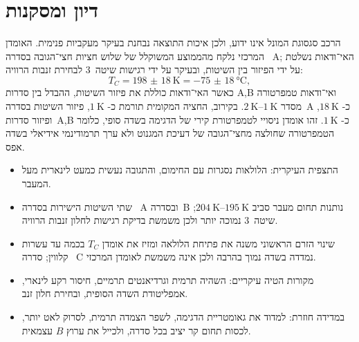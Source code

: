 \documentclass{extarticle}
\begin{document}
\section{דיון ומסקנות}
הרכב סגסוגת המונל אינו ידוע, ולכן איכות התוצאה נבחנת בעיקר מעקביות פנימית. האומדן המרכזי נלקח מהממוצע המשוקלל של שלוש חציות חצי־הגובה בסדרה~
\textenglish{A};
האי־ודאות נשלטת על ידי הפיזור בין השיטות, ובעיקר על ידי רגישות שיטה~3 לבחירת זנבות הרוויה:
\begin{equation}\label{eq:Tc-headline}
T_C=\SI{198(18)}{\kelvin}=\SI{-75(18)}{\degreeCelsius},
\end{equation}
כאשר האי־ודאות כוללת את פיזור השיטות, ההבדל בין סדרות
\textenglish{A,B}
ואי־ודאות טמפרטורה מסדר
$\SI{1}{\kelvin}$--$\SI{2}{\kelvin}$.
בקירוב, החציה המקומית תורמת כ-
$\SI{1}{\kelvin}$,
פיזור השיטות בסדרה~\textenglish{A}
כ-
$\SI{18}{\kelvin}$,
ופיזור סדרות~\textenglish{A,B}
כ-
$\SI{1}{\kelvin}$.
זהו אומדן ניסויי לטמפרטורת קירי של הדגימה בשדה סופי, כלומר הטמפרטורה שחולצה מחצי־הגובה של דעיכת המגנוט ולא ערך תרמודינמי אידיאלי בשדה אפס.

\begin{itemize}
\item התצפית העיקרית: הלולאות נסגרות עם החימום, והתגובה נעשית כמעט לינארית מעל המעבר.
\item שתי השיטות הישירות בסדרה~
\textenglish{A}
ובסדרה~\textenglish{B}
נותנות תחום מעבר סביב
$\SI{195}{\kelvin}$--$\SI{204}{\kelvin}$;
שיטה~3 נמוכה יותר ולכן משמשת בדיקת רגישות לחלון זנבות הרוויה.
\item שינוי הזרם הראשוני משנה את פתיחת הלולאה ומזיז את אומדן
$T_C$
בכמה עד עשרות קלווין; סדרה~
\textenglish{C}
נמדדה בשדה נמוך בהרבה ולכן אינה משמשת לאומדן המרכזי.
\item מקורות הטיה עיקריים: השהיה תרמית וגרדיאנטים תרמיים, חיסור רקע לינארי, אמפליטודת השדה הסופית, ובחירת חלון זנב.
\item במדידה חוזרת: למדוד את גאומטריית הדגימה, לשפר הצמדה תרמית, לסרוק לאט יותר, לכסות תחום קר יציב בכל סדרה, ולכייל את ערוץ
$B$
עצמאית.
\end{itemize}
\end{document}
